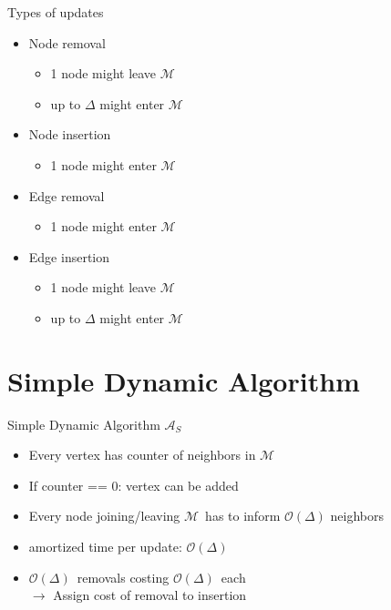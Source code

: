\documentclass{beamer}
\newcommand{\simple}{$\mathcal{A}_S$}
\newcommand{\M}{$\mathcal{M}$}
\newcommand{\OD}{$\mathcal{O}(\Delta)$}
\begin{document}
\begin{frame}{Types of updates}
  \begin{itemize}
    \item Node removal
    \begin{itemize}
      \item 1 node might leave \M
      \item up to $\Delta$ might enter \M 
    \end{itemize}

    \medskip
    \item Node insertion 
    \begin{itemize}
      \item 1 node might enter \M
    \end{itemize}
    
    \medskip
    \item Edge removal
    \begin{itemize}
      \item 1 node might enter \M
    \end{itemize}

    \medskip
    \item Edge insertion
    \begin{itemize}
      \item 1 node might leave \M
      \item up to $\Delta$ might enter \M 
    \end{itemize}
  \end{itemize}
  
\end{frame}


\section{Simple Dynamic Algorithm}
\begin{frame}{Simple Dynamic Algorithm \simple}
  \begin{itemize}
    \item Every vertex has counter of neighbors in \M
    \item If counter == 0: vertex can be added 
    \pause
    \medskip
    \item Every node joining/leaving \M\ has to inform $\mathcal{O}(\Delta)$ neighbors
    \medskip
    \item amortized time per update: \OD
    \bigskip
    \item \OD\ removals costing \OD\ each
    \\
    \pause
    $\rightarrow$ Assign cost of removal to insertion
  \end{itemize}
  
\end{frame}
\end{document}
